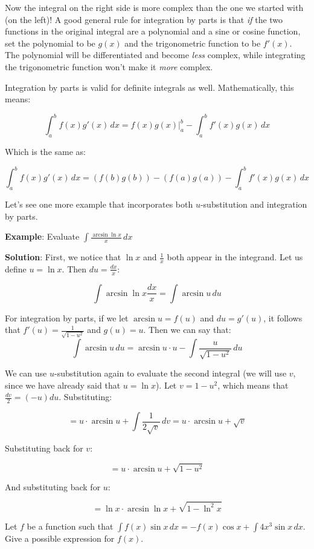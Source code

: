 Now the integral on the right side is more complex than the one we started 
with (on the left)! A good general rule for integration by parts is that 
\textit{if} the two functions in the original integral are a polynomial and a 
sine or cosine function, set the polynomial to be $g(x)$ and the trigonometric 
function to be $f'(x)$. The polynomial will be differentiated and become 
\textit{less} complex, while integrating the trigonometric function won't make 
it \textit{more} complex. 

Integration by parts is valid for definite integrals as well. Mathematically, 
this means:

$$\int_a^b f(x)g'(x)\,dx = f(x)g(x)|_a^b - \int_a^b f'(x)g(x)\,dx$$

Which is the same as:

$$\int_a^b f(x)g'(x)\,dx = \left( f(b) g(b) \right) - \left( f(a) g(a) \right) 
- \int_a^b f'(x)g(x)\,dx$$

Let's see one more example that incorporates both $u$-substitution and 
integration by parts.

\textbf{Example}: Evaluate $\int \frac{\arcsin{\ln{x}}}{x}\,dx$

\textbf{Solution}: First, we notice that $\ln{x}$ and $\frac{1}{x}$ both 
appear in the integrand. Let us define $u = \ln{x}$. Then $du = \frac{dx}{x}$:

$$\int \arcsin{\ln{x}} \frac{dx}{x} = \int \arcsin{u}\,du$$

For integration by parts, if we let $\arcsin{u} = f(u)$ and $du = g'(u)$, it 
follows that $f'(u) = \frac{1}{\sqrt{1-u^2}}$ and $g(u) = u$. Then we can say 
that:
$$\int \arcsin{u}\,du = \arcsin{u} \cdot u - \int \frac{u}{\sqrt{1-u^2}}\,du$$

We can use $u$-substitution again to evaluate the second integral (we will use 
$v$, since we have already said that $u = \ln{x}$). Let $v = 1-u^2$, which 
means that $\frac{dv}{2} = (-u)du$. Substituting:

$$= u \cdot \arcsin{u} + \int \frac{1}{2\sqrt{v}}\,dv = u \cdot \arcsin{u} + 
\sqrt{v}$$

Substituting back for $v$:

$$= u \cdot \arcsin{u} + \sqrt{1-u^2}$$

And substituting back for $u$:

$$= \ln{x} \cdot \arcsin{\ln{x}} + \sqrt{1 - \ln^2{x}}$$

\begin{Exercise}[label=int_meth3]
Let $f$ be a function such that $\int f(x) \sin{x}\,dx = -f(x)\cos{x} 
+ \int 4x^3 \sin{x}\,dx$. Give a possible expression for $f(x)$. 
\end{Exercise}


